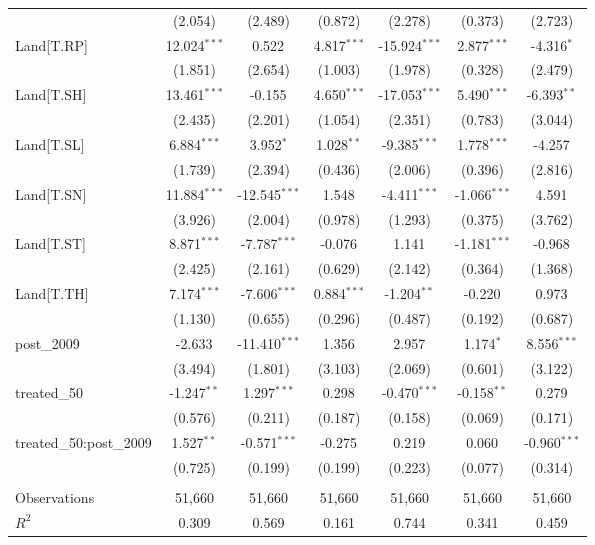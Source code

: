 \begin{table}[!htbp]
\begin{tabular}{@{\extracolsep{5pt}}lcccccc}
  & (2.054) & (2.489) & (0.872) & (2.278) & (0.373) & (2.723) \\
 Land[T.RP] & 12.024$^{***}$ & 0.522$^{}$ & 4.817$^{***}$ & -15.924$^{***}$ & 2.877$^{***}$ & -4.316$^{*}$ \\
  & (1.851) & (2.654) & (1.003) & (1.978) & (0.328) & (2.479) \\
 Land[T.SH] & 13.461$^{***}$ & -0.155$^{}$ & 4.650$^{***}$ & -17.053$^{***}$ & 5.490$^{***}$ & -6.393$^{**}$ \\
  & (2.435) & (2.201) & (1.054) & (2.351) & (0.783) & (3.044) \\
 Land[T.SL] & 6.884$^{***}$ & 3.952$^{*}$ & 1.028$^{**}$ & -9.385$^{***}$ & 1.778$^{***}$ & -4.257$^{}$ \\
  & (1.739) & (2.394) & (0.436) & (2.006) & (0.396) & (2.816) \\
 Land[T.SN] & 11.884$^{***}$ & -12.545$^{***}$ & 1.548$^{}$ & -4.411$^{***}$ & -1.066$^{***}$ & 4.591$^{}$ \\
  & (3.926) & (2.004) & (0.978) & (1.293) & (0.375) & (3.762) \\
 Land[T.ST] & 8.871$^{***}$ & -7.787$^{***}$ & -0.076$^{}$ & 1.141$^{}$ & -1.181$^{***}$ & -0.968$^{}$ \\
  & (2.425) & (2.161) & (0.629) & (2.142) & (0.364) & (1.368) \\
 Land[T.TH] & 7.174$^{***}$ & -7.606$^{***}$ & 0.884$^{***}$ & -1.204$^{**}$ & -0.220$^{}$ & 0.973$^{}$ \\
  & (1.130) & (0.655) & (0.296) & (0.487) & (0.192) & (0.687) \\
 post_2009 & -2.633$^{}$ & -11.410$^{***}$ & 1.356$^{}$ & 2.957$^{}$ & 1.174$^{*}$ & 8.556$^{***}$ \\
  & (3.494) & (1.801) & (3.103) & (2.069) & (0.601) & (3.122) \\
 treated_50 & -1.247$^{**}$ & 1.297$^{***}$ & 0.298$^{}$ & -0.470$^{***}$ & -0.158$^{**}$ & 0.279$^{}$ \\
  & (0.576) & (0.211) & (0.187) & (0.158) & (0.069) & (0.171) \\
 treated_50:post_2009 & 1.527$^{**}$ & -0.571$^{***}$ & -0.275$^{}$ & 0.219$^{}$ & 0.060$^{}$ & -0.960$^{***}$ \\
  & (0.725) & (0.199) & (0.199) & (0.223) & (0.077) & (0.314) \\
\hline \\[-1.8ex]
 Observations & 51,660 & 51,660 & 51,660 & 51,660 & 51,660 & 51,660 \\
 $R^2$ & 0.309 & 0.569 & 0.161 & 0.744 & 0.341 & 0.459 \\

\end{tabular}
\end{table}
